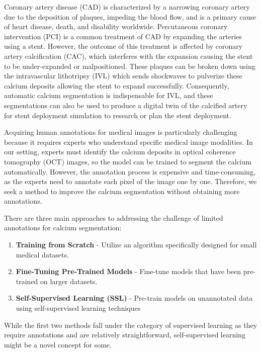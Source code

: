 \documentclass[a4paper,11pt,oneside]{report}
\begin{document}
Coronary artery disease (CAD) is characterized by a narrowing coronary artery due to the deposition of plaques, impeding the blood flow, and is a primary cause of heart disease, death, and disability worldwide. Percutaneous coronary intervention (PCI) is a common treatment of CAD by expanding the arteries using a stent. However, the outcome of this treatment is affected by coronary artery calcification (CAC), which interferes with the expansion causing the stent to be under-expanded or malpositioned. These plaques can be broken down using the intravascular lithotripsy (IVL) which sends shockwaves to pulverize these calcium deposits allowing the stent to expand successfully. Consequently, automatic calcium segmentation is indispensable for IVL, and these segmentations can also be used to produce a digital twin of the calcified artery for stent deployment simulation to research or plan the stent deployment.


Acquiring human annotations for medical images is particularly challenging because it requires experts who understand specific medical image modalities. In our setting, experts must identify the calcium deposits in optical coherence tomography (OCT) images, so the model can be trained to segment the calcium automatically. However, the annotation process is expensive and time-consuming, as the experts need to annotate each pixel of the image one by one. Therefore, we seek a method to improve the calcium segmentation without obtaining more annotations.

There are three main approaches to addressing the challenge of limited annotations for calcium segmentation: 
\begin{enumerate}
    \item \textbf{Training from Scratch} - Utilize an algorithm specifically designed for small medical datasets.
    \item \textbf{Fine-Tuning Pre-Trained Models} - Fine-tune models that have been pre-trained on larger datasets.
    \item \textbf{Self-Supervised Learning (SSL)} - Pre-train models on unannotated data using self-supervised learning techniques
\end{enumerate}
While the first two methods fall under the category of supervised learning as they require annotations and are relatively straightforward, self-supervised learning might be a novel concept for some.
\end{document}
